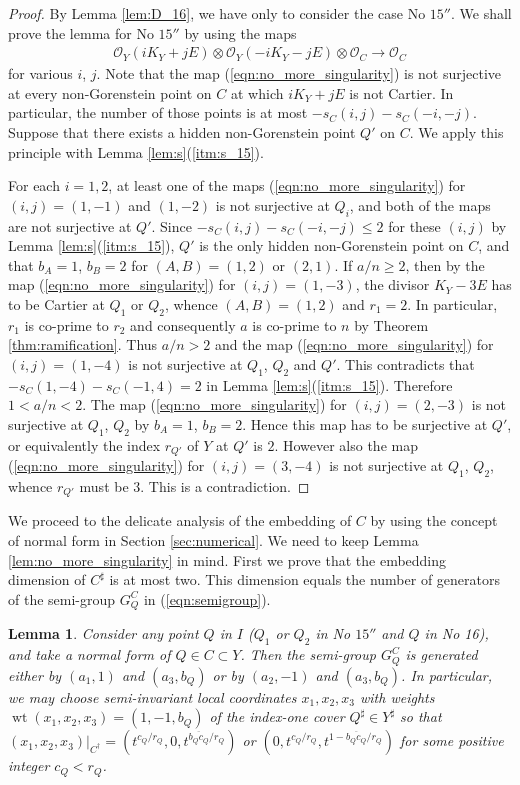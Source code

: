 \documentclass[a4paper,11pt]{amsart}
\newtheorem{lemma}[theorem]{Lemma}
\theoremstyle{definition}
\theoremstyle{remark}
\numberwithin{equation}{section}
\newcommand{\cO}{{\mathcal O}}
\newcommand{\wt}{\operatorname{wt}}
\begin{document}
\begin{proof}
By Lemma \ref{lem:D_16},
we have only to consider the case No $\textrm{15}''$.
We shall prove the lemma for No $\textrm{15}''$
by using the maps
\begin{align}\label{eqn:no_more_singularity}
\cO_Y(iK_Y+jE) \otimes \cO_Y(-iK_Y-jE) \otimes\cO_C \to \cO_C
\end{align}
for various $i$, $j$.
Note that the map (\ref{eqn:no_more_singularity})
is not surjective at every non-Gorenstein point on $C$
at which $iK_Y+jE$ is not Cartier.
In particular,
the number of those points is at most $-s_C(i,j)-s_C(-i,-j)$.
Suppose that there exists a hidden non-Gorenstein point $Q'$ on $C$.
We apply this principle with Lemma \ref{lem:s}(\ref{itm:s_15}).

For each $i=1,2$,
at least one of the maps (\ref{eqn:no_more_singularity})
for $(i,j)=(1,-1)$ and $(1,-2)$ is not surjective at $Q_i$,
and both of the maps are not surjective at $Q'$.
Since $-s_C(i,j)-s_C(-i,-j)\le2$ for these $(i,j)$
by Lemma \ref{lem:s}(\ref{itm:s_15}),
$Q'$ is the only hidden non-Gorenstein point on $C$,
and that $b_A=1$, $b_B=2$ for $(A,B)=(1,2)$ or $(2,1)$.
If $a/n \ge 2$,
then by the map (\ref{eqn:no_more_singularity}) for $(i,j)=(1,-3)$,
the divisor $K_Y-3E$ has to be Cartier at $Q_1$ or $Q_2$,
whence $(A,B)=(1,2)$ and $r_1=2$.
In particular,
$r_1$ is co-prime to $r_2$ and consequently
$a$ is co-prime to $n$ by Theorem \ref{thm:ramification}.
Thus $a/n>2$ and the map (\ref{eqn:no_more_singularity}) for $(i,j)=(1,-4)$
is not surjective at $Q_1$, $Q_2$ and $Q'$.
This contradicts that $-s_C(1,-4)-s_C(-1,4)=2$
in Lemma \ref{lem:s}(\ref{itm:s_15}).
Therefore $1<a/n<2$.
The map (\ref{eqn:no_more_singularity}) for $(i,j)=(2,-3)$ is not
surjective at $Q_1$, $Q_2$ by $b_A=1$, $b_B=2$.
Hence this map has to be surjective at $Q'$,
or equivalently the index $r_{Q'}$ of $Y$ at $Q'$ is $2$.
However also the map (\ref{eqn:no_more_singularity}) for $(i,j)=(3,-4)$
is not surjective at $Q_1$, $Q_2$, whence $r_{Q'}$ must be $3$.
This is a contradiction.
\end{proof}

We proceed to the delicate analysis of the embedding of $C$
by using the concept of normal form in Section \ref{sec:numerical}.
We need to keep Lemma \ref{lem:no_more_singularity} in mind.
First we prove that the embedding dimension of $C^\sharp$ is at most two.
This dimension equals the number of generators of
the semi-group $G_Q^C$ in (\ref{eqn:semigroup}).

\begin{lemma}\label{lem:emb_dim_2}
Consider any point $Q$ in $I$
\textup{(}$Q_1$ or $Q_2$ in No $\textrm{15}''$
and $Q$ in No 16\textup{)},
and take a normal form of $Q \in C \subset Y$.
Then the semi-group $G_Q^C$ is
generated either by $(a_1,1)$ and $(a_3,b_Q)$
or by $(a_2,-1)$ and $(a_3,b_Q)$.
In particular,
we may choose semi-invariant local coordinates
$x_1,x_2,x_3$ with weights $\wt(x_1, x_2, x_3)=(1, -1, b_Q)$
of the index-one cover $Q^\sharp \in Y^\sharp$ so that
$(x_1,x_2,x_3) |_{C^\dag}=(t^{c_Q/r_Q},0,t^{\overline{b_Qc_Q}/r_Q})$
or $(0,t^{c_Q/r_Q},t^{1-\overline{b_Qc_Q}/r_Q})$
for some positive integer $c_Q<r_Q$.
\end{lemma}
\end{document}
